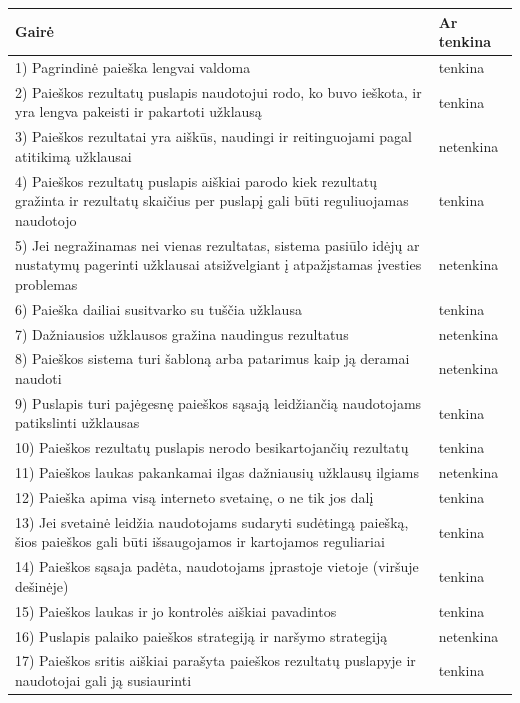 \documentclass{VUMIFPSkursinis}
\begin{document}
\begin{center}
\begin{tabular}{ |p{}|p{2cm}| } 
 \hline
	Gairė & Ar tenkina \\ \hline
	1) Pagrindinė paieška lengvai valdoma & tenkina \\ \hline
	2) Paieškos rezultatų puslapis naudotojui rodo, ko buvo ieškota, ir yra lengva pakeisti ir pakartoti užklausą & tenkina \\ \hline
	3) Paieškos rezultatai yra aiškūs, naudingi ir reitinguojami pagal atitikimą užklausai & netenkina \\ \hline
	4) Paieškos rezultatų puslapis aiškiai parodo kiek rezultatų gražinta ir rezultatų skaičius per puslapį gali būti reguliuojamas naudotojo & tenkina \\ \hline
	5) Jei negražinamas nei vienas rezultatas, sistema pasiūlo idėjų ar nustatymų pagerinti užklausai atsižvelgiant į atpažįstamas įvesties problemas & netenkina \\ \hline
	6) Paieška dailiai susitvarko su tuščia užklausa & tenkina \\ \hline
	7) Dažniausios užklausos gražina naudingus rezultatus & netenkina \\ \hline
	8) Paieškos sistema turi šabloną arba patarimus kaip ją deramai naudoti & netenkina \\ \hline
	9) Puslapis turi pajėgesnę paieškos sąsają leidžiančią naudotojams patikslinti užklausas & tenkina \\ \hline
	10) Paieškos rezultatų puslapis nerodo besikartojančių rezultatų & tenkina \\ \hline
	11) Paieškos laukas pakankamai ilgas dažniausių užklausų ilgiams & netenkina \\ \hline
	12) Paieška apima visą interneto svetainę, o ne tik jos dalį & tenkina \\ \hline
	13) Jei svetainė leidžia naudotojams sudaryti sudėtingą paiešką, šios paieškos gali būti išsaugojamos ir kartojamos reguliariai & tenkina \\ \hline
	14) Paieškos sąsaja padėta, naudotojams įprastoje vietoje (viršuje dešinėje) & tenkina \\ \hline
	15) Paieškos laukas ir jo kontrolės aiškiai pavadintos & tenkina \\ \hline
	16) Puslapis palaiko paieškos strategiją ir naršymo strategiją & netenkina \\ \hline
	17) Paieškos sritis aiškiai parašyta paieškos rezultatų puslapyje ir naudotojai gali ją susiaurinti & tenkina \\ \hline

\end{tabular}
\end{center}
\end{document}
